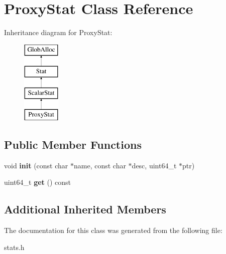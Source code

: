\hypertarget{classProxyStat}{\section{Proxy\-Stat Class Reference}
\label{classProxyStat}
}
Inheritance diagram for Proxy\-Stat\-:\begin{figure}[H]
\begin{center}
\leavevmode
\includegraphics[height=4.000000cm]{classProxyStat}
\end{center}
\end{figure}
\subsection*{Public Member Functions}
\begin{DoxyCompactItemize}
\item 
\hypertarget{classProxyStat_a1b5bfbade0a65b5a41ad2b6495cc8f05}{void {\bfseries init} (const char $\ast$name, const char $\ast$desc, uint64\-\_\-t $\ast$ptr)}\label{classProxyStat_a1b5bfbade0a65b5a41ad2b6495cc8f05}

\item 
\hypertarget{classProxyStat_aa99ac0d9155f0488b9a7428c1df20ca7}{uint64\-\_\-t {\bfseries get} () const }\label{classProxyStat_aa99ac0d9155f0488b9a7428c1df20ca7}

\end{DoxyCompactItemize}
\subsection*{Additional Inherited Members}


The documentation for this class was generated from the following file\-:\begin{DoxyCompactItemize}
\item 
stats.\-h\end{DoxyCompactItemize}
